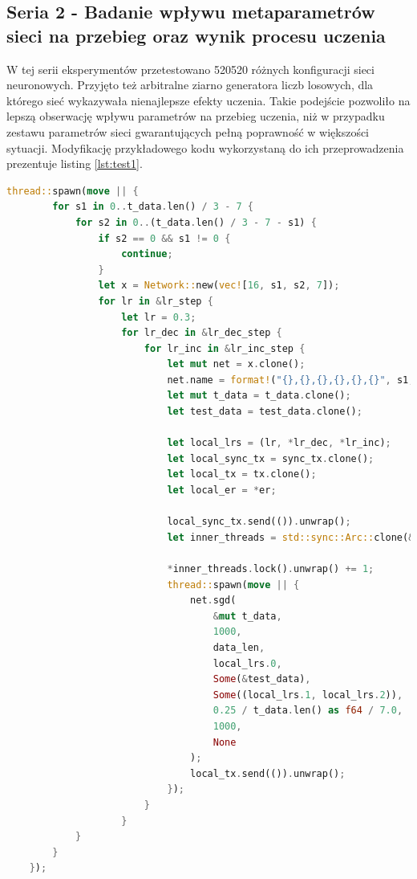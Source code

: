 \documentclass[12pt,twoside]{article}
\begin{document}
\clearpage
\subsection{Seria 2 - Badanie wpływu metaparametrów sieci na przebieg oraz wynik procesu uczenia}
W tej serii eksperymentów przetestowano 520520 różnych konfiguracji sieci neuronowych.
Przyjęto też arbitralne ziarno generatora liczb losowych, dla którego sieć wykazywała nienajlepsze efekty uczenia.
Takie podejście pozwoliło na lepszą obserwację wpływu parametrów na przebieg uczenia, niż w przypadku zestawu parametrów sieci gwarantujących pełną poprawność w większości sytuacji.
Modyfikację przykładowego kodu wykorzystaną do ich przeprowadzenia prezentuje listing \ref{lst:test1}.

\begin{lstlisting}[language=Rust,caption=Modyfikacja kodu tworzącego instancje sieci na potrzeby eksperymentu,label={lst:test1}]
    thread::spawn(move || {
        for s1 in 0..t_data.len() / 3 - 7 {
            for s2 in 0..(t_data.len() / 3 - 7 - s1) {
                if s2 == 0 && s1 != 0 {
                    continue;
                }
                let x = Network::new(vec![16, s1, s2, 7]);
                for lr in &lr_step {
                    let lr = 0.3;
                    for lr_dec in &lr_dec_step {
                        for lr_inc in &lr_inc_step {
                            let mut net = x.clone();
                            net.name = format!("{},{},{},{},{},{}", s1, s2, lr, lr_dec, lr_inc, er);
                            let mut t_data = t_data.clone();
                            let test_data = test_data.clone();

                            let local_lrs = (lr, *lr_dec, *lr_inc);
                            let local_sync_tx = sync_tx.clone();
                            let local_tx = tx.clone();
                            let local_er = *er;

                            local_sync_tx.send(()).unwrap();
                            let inner_threads = std::sync::Arc::clone(&tmp_threads);

                            *inner_threads.lock().unwrap() += 1;
                            thread::spawn(move || {
                                net.sgd(
                                    &mut t_data,
                                    1000,
                                    data_len,
                                    local_lrs.0,
                                    Some(&test_data),
                                    Some((local_lrs.1, local_lrs.2)),
                                    0.25 / t_data.len() as f64 / 7.0,
                                    1000,
                                    None
                                );
                                local_tx.send(()).unwrap();
                            });
                        }
                    }
            }
        }
    });
\end{lstlisting}
\end{document}
